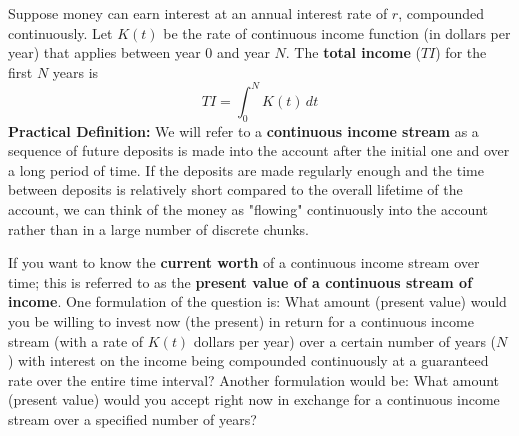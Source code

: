 \begin{tcolorbox}[title = {Continuous Income Stream}]
Suppose money can earn interest at an annual interest rate of $r$, compounded continuously. Let $K(t)$ be the rate of continuous income function (in dollars per year) that applies between year 0 and year $N$. The \textbf{total income} ($TI$) for the first $N$ years is 
\begin{equation}
    TI=\int_0^N K(t)\,dt
\end{equation}
\textbf{Practical Definition:} We will refer to a \textbf{continuous income stream} as a sequence of future deposits is made into the account after the initial one and over a long period of time. If the deposits are made regularly enough and the time between deposits is relatively short compared to the overall lifetime of the account, we can think of the money as "flowing" continuously into the account rather than in a large number of discrete chunks\footnotemark[1].
\end{tcolorbox}
\noindent If you want to know the \textbf{current worth} of a continuous income stream over time; this is referred to as the \textbf{present value of a continuous stream of income}.  One formulation of the question is:  What amount (present value) would you be willing to invest now (the present) in return for a continuous income stream (with a rate of $K(t)$ dollars per year) over a certain number of years ($N$) with interest on the income being compounded continuously at a guaranteed rate over the entire time interval?  Another formulation would be:  What amount (present value) would you accept right now in exchange for a continuous income stream over a specified number of years? \\

